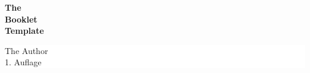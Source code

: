 
\begin{titlepage}
	\pagecolor{yellow!70!magenta}\afterpage{\nopagecolor}
	
	{\color{yellow!70!magenta!45!black}
		\parbox[t]{1.1\textwidth}{
			\parbox[t]{1.08\textwidth}{
				\raggedleft
				\fontsize{80pt}{80pt}\selectfont %
				\textbf{%
					The\\
					Booklet\\
					Template\\
				}
			}
		}
	}
	
	\vfill
	
	\hspace{0.75\textwidth}\colorbox{white}{
		\parbox[t]{0.25\textwidth}{
			\raggedleft\large
			\vspace{2mm} %
			{
				{\Large The Author}\\[4pt]
				1. Auflage\\
			}
			\vspace{2mm} %
		}
	}
\end{titlepage}
